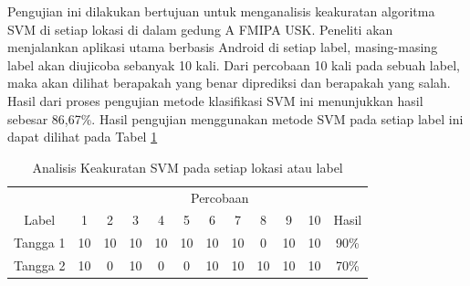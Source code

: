 \begin{enumerate}
	      \par Pengujian ini dilakukan bertujuan untuk menganalisis keakuratan algoritma SVM di setiap lokasi di dalam gedung A FMIPA USK. Peneliti akan menjalankan aplikasi utama berbasis Android di setiap label, masing-masing label akan diujicoba sebanyak 10 kali. Dari percobaan 10 kali pada sebuah label, maka akan dilihat berapakah yang benar diprediksi dan berapakah yang salah. Hasil dari proses pengujian metode klasifikasi SVM ini menunjukkan hasil sebesar 86,67\%.  Hasil pengujian menggunakan metode SVM pada setiap label ini dapat dilihat pada Tabel \ref{tabelpercobaansvm2}

	      \begin{table}[H]
		      \center
		      \caption{Analisis Keakuratan SVM pada setiap lokasi atau label}
		      \label{tabelpercobaansvm2}
		      \begin{tabular}{|lccccccccccc|}
			      \hline
			      \multicolumn{1}{|c|}{\cellcolor[HTML]{EFEFEF}}                        & \multicolumn{11}{c|}{\cellcolor[HTML]{EFEFEF}Percobaan}                                                                                                                                                                                                                                                   \\ \cline{2-12}
			      \multicolumn{1}{|c|}{\multirow{-2}{*}{\cellcolor[HTML]{EFEFEF}Label}} & \multicolumn{1}{c|}{1}                                  & \multicolumn{1}{c|}{2}  & \multicolumn{1}{c|}{3}  & \multicolumn{1}{c|}{4}  & \multicolumn{1}{c|}{5}  & \multicolumn{1}{c|}{6}  & \multicolumn{1}{c|}{7}  & \multicolumn{1}{c|}{8}  & \multicolumn{1}{c|}{9}  & \multicolumn{1}{c|}{10} & Hasil \\ \hline
			      \multicolumn{1}{|l|}{Tangga 1}                                        & \multicolumn{1}{c|}{10}                                 & \multicolumn{1}{c|}{10} & \multicolumn{1}{c|}{10} & \multicolumn{1}{c|}{10} & \multicolumn{1}{c|}{10} & \multicolumn{1}{c|}{10} & \multicolumn{1}{c|}{10} & \multicolumn{1}{c|}{0}  & \multicolumn{1}{c|}{10} & \multicolumn{1}{c|}{10} & 90\%  \\ \hline
			      \multicolumn{1}{|l|}{Tangga 2}                                        & \multicolumn{1}{c|}{10}                                 & \multicolumn{1}{c|}{0}  & \multicolumn{1}{c|}{10} & \multicolumn{1}{c|}{0}  & \multicolumn{1}{c|}{0}  & \multicolumn{1}{c|}{10} & \multicolumn{1}{c|}{10} & \multicolumn{1}{c|}{10} & \multicolumn{1}{c|}{10} & \multicolumn{1}{c|}{10} & 70\%  \\ \hline

\end{tabular}
\end{table}
\end{enumerate}
